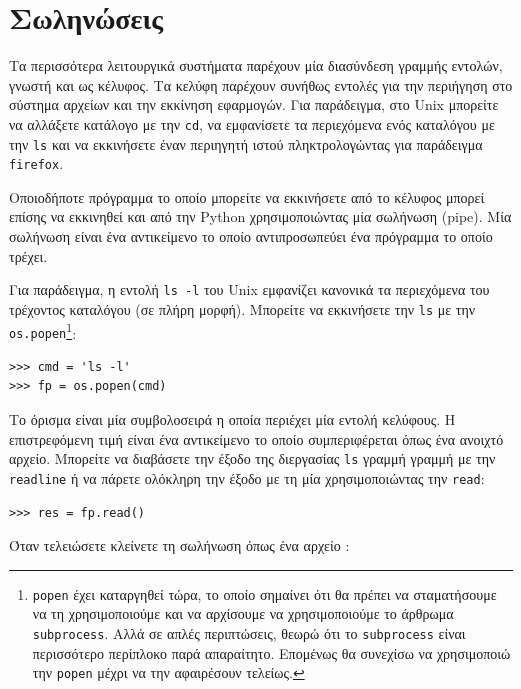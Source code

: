\documentclass[10pt]{book}
\begin{document}
\section{Σωληνώσεις}

Τα περισσότερα λειτουργικά συστήματα παρέχουν μία διασύνδεση γραμμής εντολών, γνωστή και ως κέλυφος. Τα κελύφη παρέχουν συνήθως εντολές για την περιήγηση στο σύστημα αρχείων και την εκκίνηση εφαρμογών. Για παράδειγμα, στο  Unix  μπορείτε να αλλάξετε κατάλογο με την  
{\tt cd},  να εμφανίσετε τα περιεχόμενα ενός καταλόγου με την  {\tt ls}  και να εκκινήσετε έναν περιηγητή ιστού πληκτρολογώντας για παράδειγμα  {\tt firefox}.

 Οποιοδήποτε πρόγραμμα το οποίο μπορείτε να εκκινήσετε από το κέλυφος μπορεί επίσης να εκκινηθεί και από την  Python  χρησιμοποιώντας μία σωλήνωση  (pipe).  Μία σωλήνωση είναι ένα αντικείμενο το οποίο αντιπροσωπεύει ένα πρόγραμμα το οποίο τρέχει.

Για παράδειγμα, η εντολή   {\tt ls -l} του  Unix  εμφανίζει κανονικά τα περιεχόμενα του τρέχοντος καταλόγου (σε πλήρη μορφή). Μπορείτε να εκκινήσετε την  {\tt ls}  με την  {\tt os.popen}\footnote{{\tt popen}  έχει καταργηθεί τώρα, το οποίο σημαίνει ότι θα πρέπει να σταματήσουμε να τη χρησιμοποιούμε και να αρχίσουμε να χρησιμοποιούμε το άρθρωμα  {\tt subprocess}.  Αλλά σε απλές περιπτώσεις, θεωρώ ότι το  {\tt subprocess}  είναι περισσότερο περίπλοκο παρά απαραίτητο. Επομένως θα συνεχίσω να χρησιμοποιώ  την  {\tt popen}  μέχρι να την αφαιρέσουν τελείως. }:


\begin{verbatim}
>>> cmd = 'ls -l'
>>> fp = os.popen(cmd)
\end{verbatim}
%
 Το όρισμα είναι μία συμβολοσειρά η οποία περιέχει μία εντολή κελύφους. Η επιστρεφόμενη τιμή είναι ένα αντικείμενο το οποίο συμπεριφέρεται όπως ένα ανοιχτό αρχείο. Μπορείτε να διαβάσετε την έξοδο της διεργασίας  {\tt ls}  γραμμή γραμμή με την  {\tt readline}  ή να πάρετε ολόκληρη την έξοδο με τη μία χρησιμοποιώντας την  {\tt read}:

\begin{verbatim}
>>> res = fp.read()
\end{verbatim}
%
 Όταν τελειώσετε κλείνετε τη σωλήνωση όπως ένα αρχείο :
\end{document}
